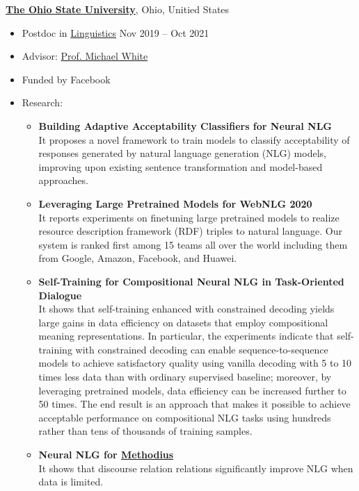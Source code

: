{\bf \href{https://www.osu.edu/}{The Ohio State University}}, Ohio, Unitied States
\begin{itemize}
    \item[] Postdoc in \href{https://linguistics.osu.edu/}{Linguistics} \hfill Nov 2019 -- Oct 2021
    \item[] Advisor: \href{https://u.osu.edu/white.1240/}{Prof. Michael White}
    \item[] Funded by Facebook
    \item[] Research:
    \begin{itemize}
        \item {\bf Building Adaptive Acceptability Classifiers for Neural NLG}~\cite{batra-etal-2021-building} \\
            It proposes a novel framework to train models to classify acceptability of responses generated by natural language generation (NLG) models, improving upon existing sentence transformation and model-based approaches.
        \item {\bf Leveraging Large Pretrained Models for {W}eb{NLG} 2020}~\cite{li-etal-2020-leveraging-large} \\
            It reports experiments on finetuning large pretrained models to realize resource description framework (RDF) triples to natural language.
            Our system is ranked first among 15 teams all over the world including them from Google, Amazon, Facebook, and Huawei.
        \item {\bf Self-Training for Compositional Neural NLG in Task-Oriented Dialogue}~\cite{li-white-wecnlp-2020, li-etal-2021-self} \\
            It shows that self-training enhanced with constrained decoding yields large gains in data efficiency on datasets that employ compositional meaning representations.
            In particular, the experiments indicate that self-training with constrained decoding can enable sequence-to-sequence models to achieve satisfactory quality using vanilla decoding with 5 to 10 times less data than with ordinary supervised baseline; moreover, by leveraging pretrained models, data efficiency can be increased further to 50 times.
            The end result is an approach that makes it possible to achieve acceptable performance on compositional NLG tasks using hundreds rather than tens of thousands of training samples.
        \item {\bf Neural NLG for \href{https://aclanthology.org/L16-1273/}{Methodius}}~\cite{stevens-guille-etal-2020-neural, maskharashvili-etal-2021-neural} \\
            It shows that discourse relation relations significantly improve NLG when data is limited.
    \end{itemize}
\end{itemize}

